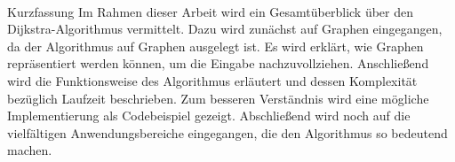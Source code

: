 \kurzfassung

\paragraph*{}

Kurzfassung
Im Rahmen dieser Arbeit wird ein Gesamtüberblick über den Dijkstra-Algorithmus vermittelt.
Dazu wird zunächst auf Graphen eingegangen, da der Algorithmus auf Graphen ausgelegt ist. Es wird erklärt, wie Graphen repräsentiert werden können, um die Eingabe nachzuvollziehen.
Anschließend wird die Funktionsweise des Algorithmus erläutert und dessen Komplexität bezüglich Laufzeit  beschrieben. Zum besseren Verständnis wird eine mögliche Implementierung als Codebeispiel gezeigt.
Abschließend wird noch auf die vielfältigen Anwendungsbereiche eingegangen, die den Algorithmus so bedeutend machen.


